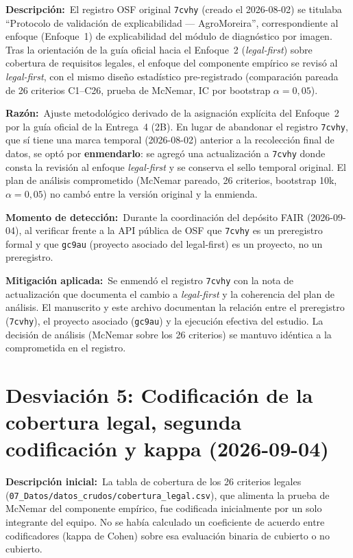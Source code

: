 \documentclass[11pt,a4paper]{article}
\begin{document}
\textbf{Descripci\'{o}n:}~El registro OSF original \texttt{7cvhy} (creado el
2026-08-02) se titulaba ``Protocolo de validaci\'{o}n de explicabilidad ---
AgroMoreira'', correspondiente al enfoque (Enfoque~1) de explicabilidad del
m\'{o}dulo de diagn\'{o}stico por imagen. Tras la orientaci\'{o}n de la
gu\'{i}a oficial hacia el Enfoque~2 (\emph{legal-first}) sobre cobertura de
requisitos legales, el enfoque del componente emp\'{i}rico se revis\'{o} al
\emph{legal-first}, con el mismo dise\~{n}o estad\'{i}stico pre-registrado
(comparaci\'{o}n pareada de 26 criterios C1--C26, prueba de McNemar, IC por
bootstrap $\alpha = 0{,}05$).

\textbf{Raz\'{o}n:}~Ajuste metodol\'{o}gico derivado de la asignaci\'{o}n
expl\'{i}cita del Enfoque~2 por la gu\'{i}a oficial de la Entrega~4 (2B). En
lugar de abandonar el registro \texttt{7cvhy}, que s\'{i} tiene una marca
temporal (2026-08-02) anterior a la recolecci\'{o}n final de datos, se
opt\'{o} por \textbf{enmendarlo}: se agreg\'{o} una actualizaci\'{o}n a
\texttt{7cvhy} donde consta la revisi\'{o}n al enfoque \emph{legal-first} y se
conserva el sello temporal original. El plan de an\'{a}lisis comprometido (McNemar
pareado, 26 criterios, bootstrap 10k, $\alpha = 0{,}05$) no camb\'{o} entre la
versi\'{o}n original y la enmienda.

\textbf{Momento de detecci\'{o}n:}~Durante la coordinaci\'{o}n del dep\'{o}sito
FAIR (2026-09-04), al verificar frente a la API p\'{u}blica de OSF que
\texttt{7cvhy} es un preregistro formal y que \texttt{gc9au} (proyecto
asociado del legal-first) es un proyecto, no un preregistro.

\textbf{Mitigaci\'{o}n aplicada:}~Se enmend\'{o} el registro \texttt{7cvhy} con
la nota de actualizaci\'{o}n que documenta el cambio a \emph{legal-first} y la
coherencia del plan de an\'{a}lisis. El manuscrito y este archivo documentan la
relaci\'{o}n entre el preregistro (\texttt{7cvhy}), el proyecto asociado
(\texttt{gc9au}) y la ejecuci\'{o}n efectiva del estudio. La decisi\'{o}n de
an\'{a}lisis (McNemar sobre los 26 criterios) se mantuvo id\'{e}ntica a la
comprometida en el registro.

\section*{Desviaci\'{o}n 5: Codificaci\'{o}n de la cobertura legal, segunda codificaci\'{o}n y kappa (2026-09-04)}

\textbf{Descripci\'{o}n inicial:}~La tabla de cobertura de los 26 criterios
legales (\texttt{07\_Datos/datos\_crudos/cobertura\_legal.csv}), que alimenta la
prueba de McNemar del componente emp\'{i}rico, fue codificada inicialmente por un
solo integrante del equipo. No se hab\'{i}a calculado un coeficiente de acuerdo
entre codificadores (kappa de Cohen) sobre esa evaluaci\'{o}n binaria de cubierto
o no cubierto.
\end{document}
